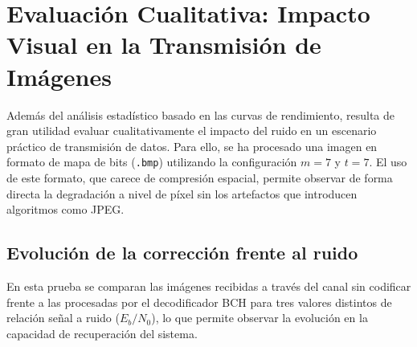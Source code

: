 \section{Evaluación Cualitativa: Impacto Visual en la Transmisión de Imágenes}
\label{sec:impacto_visual}

Además del análisis estadístico basado en las curvas de rendimiento, resulta de gran utilidad evaluar cualitativamente el impacto del ruido en un escenario práctico de transmisión de datos. Para ello, se ha procesado una imagen en formato de mapa de bits (\texttt{.bmp}) utilizando la configuración $m=7$ y $t=7$. El uso de este formato, que carece de compresión espacial, permite observar de forma directa la degradación a nivel de píxel sin los artefactos que introducen algoritmos como JPEG.

\subsection{Evolución de la corrección frente al ruido}

En esta prueba se comparan las imágenes recibidas a través del canal sin codificar frente a las procesadas por el decodificador BCH para tres valores distintos de relación señal a ruido ($E_b/N_0$), lo que permite observar la evolución en la capacidad de recuperación del sistema.

